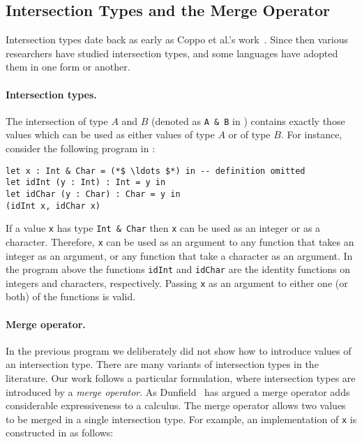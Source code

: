 \subsection{Intersection Types and the Merge Operator}

Intersection types date back as early as Coppo et
al.'s work~\cite{coppo1981functional}. Since then various researchers have
studied intersection types, and some languages have adopted them in one
form or another.

\paragraph{Intersection types.}
The intersection of type $A$ and $B$ (denoted as \lstinline{A & B} in
\namedis) contains exactly those values
which can be used as either values of type $A$ or of type $B$. For instance,
consider the following program in \namedis:

\begin{lstlisting}
let x : Int & Char = (*$ \ldots $*) in -- definition omitted
let idInt (y : Int) : Int = y in
let idChar (y : Char) : Char = y in
(idInt x, idChar x)
\end{lstlisting}

\noindent If a value \lstinline{x} has type \lstinline{Int & Char} then
\lstinline{x} can be used as an integer or as a character. Therefore,
\lstinline{x} can be used as an argument to any function that takes
an integer as an argument, or any
function that take a character as an argument. In the program above
the functions \lstinline{idInt} and \lstinline{idChar} are the
identity functions on integers and characters, respectively.
Passing \lstinline{x} as an argument to either one (or both) of the
functions is valid.

\paragraph{Merge operator.}
In the previous program we deliberately did not show how to introduce values of an
intersection type. There are many variants of intersection types
in the literature. Our work follows a particular formulation, where
intersection types are introduced by a \emph{merge operator}.
As Dunfield~\cite{dunfield2014elaborating} has argued a merge operator adds considerable
expressiveness to a calculus. The merge operator allows
two values to be merged in a single intersection type. For example, an
implementation of \lstinline{x} is constructed in \namedis as follows:

